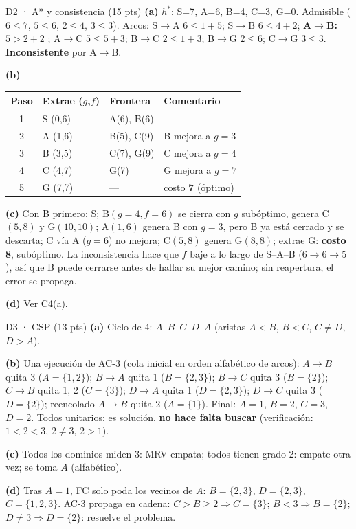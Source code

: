 \begin{solucion}{D2 · A* y consistencia (15 pts)}
\textbf{(a)} $h^*$: S=7, A=6, B=4, C=3, G=0. Admisible ($6\le7$, $5\le6$, $2\le4$, $3\le3$). Arcos:
S$\to$A $6\le1+5$; S$\to$B $6\le4+2$; \textbf{A$\to$B: $5>2+2$} \texttimes{}; A$\to$C $5\le5+3$; B$\to$C $2\le1+3$;
B$\to$G $2\le6$; C$\to$G $3\le3$. \textbf{Inconsistente} por A$\to$B.

\textbf{(b)}
\begin{center}\small
\begin{tabular}{clll}
\toprule
Paso & Extrae ($g$,$f$) & Frontera & Comentario\\
\midrule
1 & S (0,6) & A(6), B(6) & \\
2 & A (1,6) & B(5), C(9) & B mejora a $g=3$\\
3 & B (3,5) & C(7), G(9) & C mejora a $g=4$\\
4 & C (4,7) & G(7) & G mejora a $g=7$\\
5 & G (7,7) & — & costo \textbf{7} (óptimo)\\
\bottomrule
\end{tabular}
\end{center}

\textbf{(c)} Con B primero: S; B$(g=4,f=6)$ se cierra con $g$ subóptimo, genera C$(5,8)$ y G$(10,10)$; A$(1,6)$
genera B con $g=3$, pero B ya está cerrado y se descarta; C vía A ($g=6$) no mejora; C$(5,8)$ genera G$(8,8)$;
extrae G: \textbf{costo 8}, subóptimo. La inconsistencia hace que $f$ baje a lo largo de S–A–B
($6\to6\to5$), así que B puede cerrarse antes de hallar su mejor camino; sin reapertura, el error se propaga.

\textbf{(d)} Ver C4(a).
\end{solucion}

\begin{solucion}{D3 · CSP (13 pts)}
\textbf{(a)} Ciclo de 4: $A$–$B$–$C$–$D$–$A$ (aristas $A<B$, $B<C$, $C\ne D$, $D>A$).

\textbf{(b)} Una ejecución de AC-3 (cola inicial en orden alfabético de arcos):
$A\to B$ quita 3 ($A=\{1,2\}$); $B\to A$ quita 1 ($B=\{2,3\}$); $B\to C$ quita 3 ($B=\{2\}$);
$C\to B$ quita 1, 2 ($C=\{3\}$); $D\to A$ quita 1 ($D=\{2,3\}$); $D\to C$ quita 3 ($D=\{2\}$);
reencolado $A\to B$ quita 2 ($A=\{1\}$). Final: $A=1$, $B=2$, $C=3$, $D=2$. Todos unitarios: es
solución, \textbf{no hace falta buscar} (verificación: $1<2<3$, $2\ne3$, $2>1$).

\textbf{(c)} Todos los dominios miden 3: MRV empata; todos tienen grado 2: empate otra vez; se toma $A$ (alfabético).

\textbf{(d)} Tras $A=1$, FC solo poda los vecinos de $A$: $B=\{2,3\}$, $D=\{2,3\}$, $C=\{1,2,3\}$. AC-3 propaga en
cadena: $C>B\ge2\Rightarrow C=\{3\}$; $B<3\Rightarrow B=\{2\}$; $D\ne3\Rightarrow D=\{2\}$: resuelve el problema.
\end{solucion}

